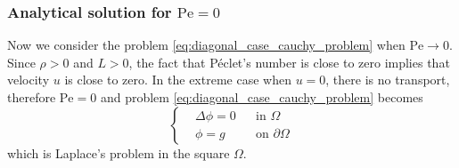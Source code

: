 \subsubsection{Analytical solution for \texorpdfstring{$\mathrm{Pe} = 0$}{zero Péclet's number}}

Now we consider the problem \eqref{eq:diagonal_case_cauchy_problem} when $\mathrm{Pe} \to 0$. Since $\rho > 0$ and $L > 0$, the fact that Péclet's number is close to zero implies that velocity $u$ is close to zero. In the extreme case when $u = 0$, there is no transport, therefore $\mathrm{Pe} = 0$ and problem \eqref{eq:diagonal_case_cauchy_problem} becomes
\begin{equation} \label{eq:diagonal_case_cauchy_problem_zero_peclet}
	\left\{
	\begin{aligned}
		&\Delta \phi = 0 &
		&\text{in } \Omega \\
		&\phi = g &
		&\text{on } \partial \Omega
	\end{aligned}
	\right.
\end{equation}
which is Laplace's problem in the square $\Omega$. 